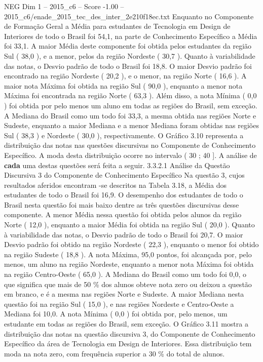 \begin{textsample}{NEG Dim 1 – 2015\_c6 – Score -1.00 – 2015\_c6/enade\_2015\_tec\_des\_inter\_2e210f18ec.txt}
Enquanto no Componente de Formação Geral a Média para estudantes de Tecnologia em Design de Interiores de todo o Brasil foi 54,1, na parte de Conhecimento Específico a Média foi 33,1.
A maior Média deste componente foi obtida pelos estudantes da região Sul ( 38,0 ), e a menor, pelos da região Nordeste ( 30,7 ).
Quanto à variabilidade das notas, o Desvio padrão de todo o Brasil foi 18,8.
O maior Desvio padrão foi encontrado na região Nordeste ( 20,2 ), e o menor, na região Norte ( 16,6 ).
A maior nota Máxima foi obtida na região Sul ( 90,0 ), enquanto a menor nota Máxima foi encontrada na região Norte ( 63,3 ).
Além disso, a nota Mínima ( 0,0 ) foi obtida por pelo menos um aluno em todas as regiões do Brasil, sem exceção.
A Mediana do Brasil como um todo foi 33,3, a mesma obtida nas regiões Norte e Sudeste, enquanto a maior Mediana e a menor Mediana foram obtidas nas regiões Sul ( 38,3 ) e Nordeste ( 30,0 ), respectivamente.
O Gráfico 3.10 representa a distribuição das notas nas questões discursivas no Componente de Conhecimento Específico.
A moda desta distribuição ocorre no intervalo ( 30 ; 40 ].
A análise de \textbf{cada} uma destas questões será feita a seguir. 3.3.2.1 Análise da Questão Discursiva 3 do Componente de Conhecimento Específico Na questão 3, cujos resultados aferidos encontram -se descritos na Tabela 3.18, a Média dos estudantes de todo o Brasil foi 16,9.
O desempenho dos estudantes de todo o Brasil nesta questão foi mais baixo dentre as três questões discursivas desse componente.
A menor Média nessa questão foi obtida pelos alunos da região Norte ( 12,0 ), enquanto a maior Média foi obtida na região Sul ( 20,0 ).
Quanto à variabilidade das notas, o Desvio padrão de todo o Brasil foi 20,7.
O maior Desvio padrão foi obtido na região Nordeste ( 22,3 ), enquanto o menor foi obtido na região Sudeste ( 18,8 ).
A nota Máxima, 95,0 pontos, foi alcançada por, pelo menos, um aluno na região Nordeste, enquanto a menor nota Máxima foi obtida na região Centro-Oeste ( 65,0 ).
A Mediana do Brasil como um todo foi 0,0, o que significa que mais de 50 \% dos alunos obteve nota zero ou deixou a questão em branco, e é a mesma nas regiões Norte e Sudeste.
A maior Mediana nesta questão foi na região Sul ( 15,0 ), e nas regiões Nordeste e Centro-Oeste a Mediana foi 10,0.
A nota Mínima ( 0,0 ) foi obtida por, pelo menos, um estudante em todas as regiões do Brasil, sem exceção.
O Gráfico 3.11 mostra a distribuição das notas na questão discursiva 3, do Componente de Conhecimento Específico da área de Tecnologia em Design de Interiores.
Essa distribuição tem moda na nota zero, com frequência superior a 30 \% do total de alunos.

\end{textsample}
